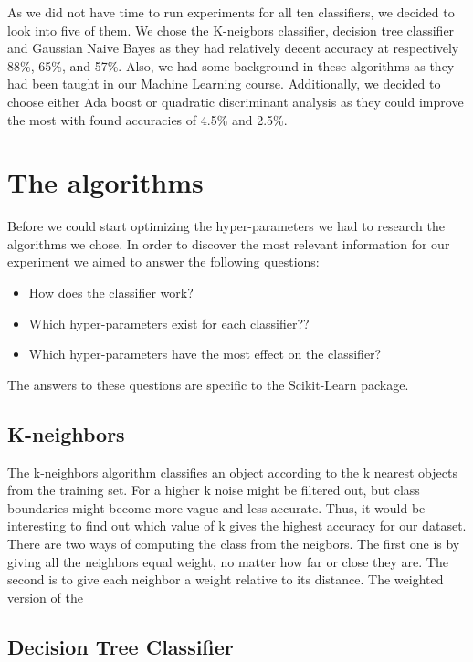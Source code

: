\documentclass{article}
\begin{document}
As we did not have time to run experiments for all ten classifiers, we decided to look into five of them. We chose the K-neigbors classifier, decision tree classifier and Gaussian Naive Bayes as they had relatively decent accuracy at respectively 88\%, 65\%, and 57\%. Also, we had some background in these algorithms as they had been taught in our Machine Learning course. Additionally, we decided to choose either Ada boost or quadratic discriminant analysis as they could improve the most with found accuracies of 4.5\% and 2.5\%. 

\newpage
\section{The algorithms}
Before we could start optimizing the hyper-parameters we had to research the algorithms we chose. In order to discover the most relevant information for our experiment we aimed to answer the following questions:

\begin{itemize}
	\item How does the classifier work? 
	\item Which hyper-parameters exist for each classifier??
	\item Which hyper-parameters have the most effect on the classifier?
\end{itemize}

The answers to these questions are specific to the Scikit-Learn package.

\subsection{K-neighbors}
The k-neighbors algorithm classifies an object according to the k nearest objects from the training set. For a higher k noise might be filtered out, but class boundaries might become more vague and less accurate. Thus, it would be interesting to find out which value of k gives the highest accuracy for our dataset. There are two ways of computing the class from the neigbors. The first one is by giving all the neighbors equal weight, no matter how far or close they are.  The second is to give each neighbor a weight relative to its distance. The weighted version of the 

\subsection{Decision Tree Classifier}
\end{document}
